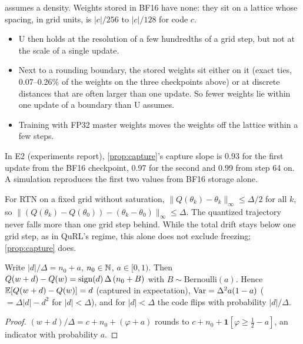 \documentclass[11pt]{article}
\begin{document}
\begin{remark}[BF16 storage]\label{rem:bf16}
 assumes a density. Weights stored in BF16 have none: they sit on a lattice whose spacing, in grid units, is $|c|/256$ to $|c|/128$ for code $c$.
\begin{itemize}
\item U then holds at the resolution of a few hundredths of a grid step, but not at the scale of a single update.
\item Next to a rounding boundary, the stored weights sit either on it (exact ties, 0.07--0.26\% of the weights on the three checkpoints above) or at discrete distances that are often larger than one update. So fewer weights lie within one update of a boundary than U assumes.
\item Training with FP32 master weights moves the weights off the lattice within a few steps.
\end{itemize}
In E2 (experiments report), \cref{prop:capture}'s capture slope is 0.93 for the first update from the BF16 checkpoint, 0.97 for the second and 0.99 from step 64 on. A simulation reproduces the first two values from BF16 storage alone.
\end{remark}

\begin{proposition}\label{prop:lag}
For RTN on a fixed grid without saturation, $\|Q(\theta_k)-\theta_k\|_\infty\le\Delta/2$ for all $k$, so $\|(Q(\theta_k)-Q(\theta_0))-(\theta_k-\theta_0)\|_\infty\le\Delta$. The quantized trajectory never falls more than one grid step behind. While the total drift stays below one grid step, as in QuRL's regime, this alone does not exclude freezing; \cref{prop:capture} does.
\end{proposition}

\begin{proposition}\label{prop:capture}
Write $|d|/\Delta=n_0+a$, $n_0\in\mathbb{N}$, $a\in[0,1)$. Then $Q(w+d)-Q(w)=\operatorname{sign}(d)\,\Delta\,(n_0+B)$ with $B\sim\mathrm{Bernoulli}(a)$. Hence $\mathbb{E}[Q(w+d)-Q(w)]=d$ (captured in expectation), $\operatorname{Var}=\Delta^2a(1-a)$ ($=\Delta|d|-d^2$ for $|d|<\Delta$), and for $|d|<\Delta$ the code flips with probability $|d|/\Delta$.
\end{proposition}
\begin{proof}
$(w+d)/\Delta=c+n_0+(\varphi+a)$ rounds to $c+n_0+\mathbf 1[\varphi\ge\tfrac12-a]$, an indicator with probability $a$.
\end{proof}
\end{document}
